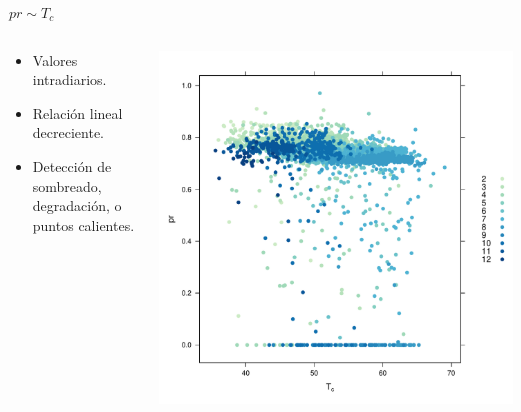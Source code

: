 \documentclass[aspectratio=169, usenames,svgnames,dvipsnames]{beamer}
\begin{document}
\begin{frame}[label={sec:orgfbedb63}]{\(pr \sim T_c\)}
\begin{columns}
\begin{column}{0.3\columnwidth}
\begin{itemize}
\item Valores intradiarios.
\item Relación lineal decreciente.
\item Detección de sombreado, degradación, o puntos calientes.
\end{itemize}
\end{column}

\begin{column}{0.7\columnwidth}
\begin{center}
\includegraphics[height=0.95\textheight]{../figs/prTc.pdf}
\end{center}
\end{column}
\end{columns}
\end{frame}
\end{document}
